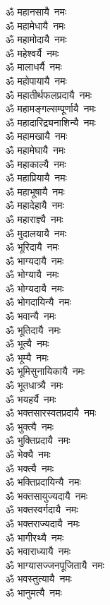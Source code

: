 \begin{flushleft}
\begin{multicols}{2}
ॐ महानसायै~नमः\\
ॐ महामेधायै~नमः\\
ॐ महामोदायै~नमः\\
ॐ महेश्वर्यै~नमः\\
ॐ मालाधर्यै~नमः\\
ॐ महोपायायै~नमः\hfill{}\\
ॐ महातीर्थफलप्रदायै~नमः\\
ॐ महामङ्गल्सम्पूर्णायै~नमः\\
ॐ महादारिद्र्यनाशिन्यै~नमः\\
ॐ महामखायै~नमः\\
ॐ महामेघायै~नमः\\
ॐ महाकाल्यै~नमः\\
ॐ महाप्रियायै~नमः\\
ॐ महाभूषायै~नमः\\
ॐ महादेहायै~नमः\\
ॐ महाराज्ञ्यै~नमः\hfill{}\\
ॐ मुदालयायै~नमः\\
ॐ भूरिदायै~नमः\\
ॐ भाग्यदायै~नमः\\
ॐ भोग्यायै~नमः\\
ॐ भोग्यदायै~नमः\\
ॐ भोगदायिन्यै~नमः\\
ॐ भवान्यै~नमः\\
ॐ भूतिदायै~नमः\\
ॐ भूत्यै~नमः\\
ॐ भूम्यै~नमः\hfill{}\\
ॐ भूमिसुनायिकायै~नमः\\
ॐ भूतधात्र्यै~नमः\\
ॐ भयहर्यै~नमः\\
ॐ भक्तसारस्वतप्रदायै~नमः\\
ॐ भुक्त्यै~नमः\\
ॐ भुक्तिप्रदायै~नमः\\
ॐ भेक्यै~नमः\\
ॐ भक्त्यै~नमः\\
ॐ भक्तिप्रदायिन्यै~नमः\\
ॐ भक्तसायुज्यदायै~नमः\hfill{}\\
ॐ भक्तस्वर्गदायै~नमः\\
ॐ भक्तराज्यदायै~नमः\\
ॐ भागीरथ्यै~नमः\\
ॐ भवाराध्यायै~नमः\\
ॐ भाग्यासज्जनपूजितायै~नमः\\
ॐ भवस्तुत्यायै~नमः\\
ॐ भानुमत्यै~नमः\\

\end{multicols}
\end{flushleft}
